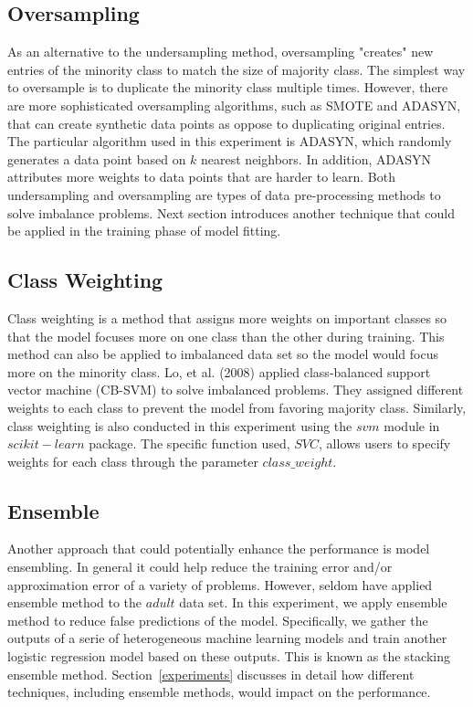 \documentclass{article}
\begin{document}
\subsection{Oversampling}
\label{oversampling}

As an alternative to the undersampling method, oversampling "creates" new entries of the minority class to match the size of majority class. The simplest way to oversample is to duplicate the minority class multiple times. However, there are more sophisticated oversampling algorithms, such as SMOTE and ADASYN, that can create synthetic data points as oppose to duplicating original entries. The particular algorithm used in this experiment is ADASYN, which randomly generates a data point based on $k$ nearest neighbors. In addition, ADASYN attributes more weights to data points that are harder to learn. Both undersampling and oversampling are types of data pre-processing methods to solve imbalance problems. Next section introduces another technique that could be applied in the training phase of model fitting.

\subsection{Class Weighting}
\label{class_weighting}

Class weighting is a method that assigns more weights on important classes so that the model focuses more on one class than the other during training. This method can also be applied to imbalanced data set so the model would focus more on the minority class. Lo, et al. (2008) applied class-balanced support vector machine (CB-SVM) to solve imbalanced problems. They assigned different weights to each class to prevent the model from favoring majority class. Similarly, class weighting is also conducted in this experiment using the $svm$ module in $scikit-learn$ package. The specific function used, $SVC$, allows users to specify weights for each class through the parameter $class\_weight$.

\subsection{Ensemble}
\label{ensemble}

Another approach that could potentially enhance the performance is model ensembling. In general it could help reduce the training error and/or approximation error of a variety of problems. However, seldom have applied ensemble method to the $adult$ data set. In this experiment, we apply ensemble method to reduce false predictions of the model. Specifically, we gather the outputs of a serie of heterogeneous machine learning models and train another logistic regression model based on these outputs. This is known as the stacking ensemble method. Section~\ref{experiments} discusses in detail how different techniques, including ensemble methods, would impact on the performance.
\end{document}
